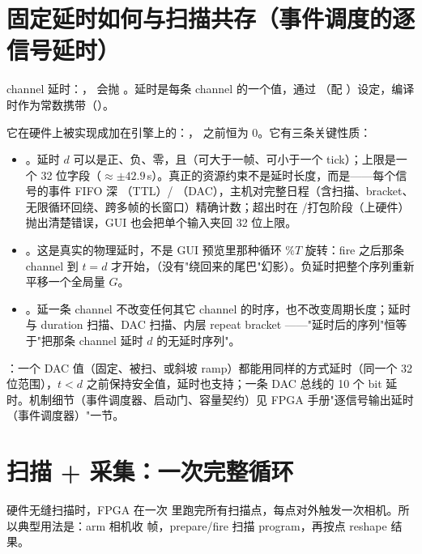 \documentclass[11pt,oneside,openany]{book}
\begin{document}
\section{固定延时如何与扫描共存（事件调度的逐信号延时）}
channel 延时：， 会抛 。延时是每条 channel 的一个值，通过 （配 ）设定，编译时作为常数携带（）。

它在硬件上被实现成加在引擎上的：， 之前恒为 0。它有三条关键性质：

\begin{itemize}
  \item {}。延时 $d$ 可以是正、负、零，且（可大于一帧、可小于一个 tick）；上限是一个 32 位字段（$\approx\pm42.9\,$s）。真正的资源约束不是延时长度，而是——每个信号的事件 FIFO 深 （TTL）/ （DAC），主机对完整日程（含扫描、bracket、无限循环回绕、跨多帧的长窗口）精确计数；超出时在 /打包阶段（上硬件）抛出清楚错误，GUI 也会把单个输入夹回 32 位上限。
  \item {}。这是真实的物理延时，不是 GUI 预览里那种循环 \%$T$ 旋转：fire 之后那条 channel 到 $t=d$ 才开始，（没有"绕回来的尾巴"幻影）。负延时把整个序列重新平移一个全局量 $G$。
  \item {}。延一条 channel 不改变任何其它 channel 的时序，也不改变周期长度；延时与 duration 扫描、DAC 扫描、内层 repeat bracket ——"延时后的序列"恒等于"把那条 channel 延时 $d$ 的无延时序列"。
\end{itemize}

：一个 DAC 值（固定、被扫、或斜坡 ramp）都能用同样的方式延时（同一个 32 位范围），$t<d$ 之前保持安全值，延时也支持；一条 DAC 总线的 10 个 bit 延时。机制细节（事件调度器、启动门、容量契约）见 FPGA 手册"逐信号输出延时（事件调度器）"一节。

\section{扫描 + 采集：一次完整循环}
硬件无缝扫描时，FPGA 在一次  里跑完所有扫描点，每点对外触发一次相机。所以典型用法是：arm 相机收  帧，prepare/fire 扫描 program，再按点 reshape 结果。
\end{document}
